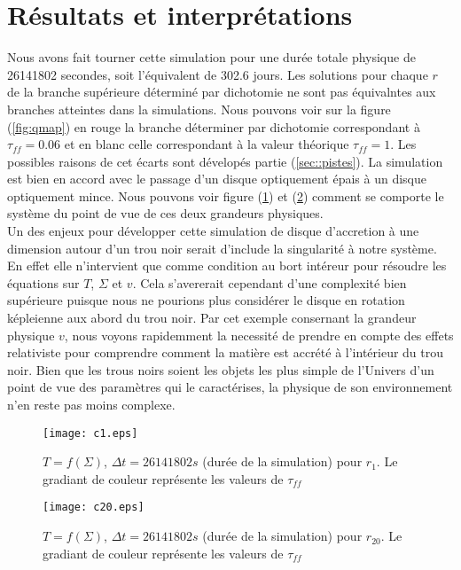 \section{Résultats et interprétations}

Nous avons fait tourner cette simulation pour une durée totale physique de 26141802 secondes, soit l'équivalent de 302.6 jours. 
Les solutions pour chaque $r$ de la branche supérieure déterminé par dichotomie ne sont pas équivalntes aux branches atteintes dans la simulations. Nous pouvons voir sur la figure (\ref{fig:qmap}) en rouge la branche déterminer par dichotomie correspondant à $\tau_{ff} = 0.06 $ et en blanc celle correspondant à la valeur théorique $\tau_{ff} = 1$. Les possibles raisons de cet écarts sont dévelopés partie (\ref{sec::pistes}). La simulation est bien en accord avec le passage d'un disque optiquement épais à un disque optiquement mince. Nous pouvons voir figure (\ref{fig:c1.eps}) et (\ref{fig:c20.eps}) comment se comporte le système du point de vue de ces deux grandeurs physiques.  \\


Un des enjeux pour développer cette simulation de disque d'accretion à une dimension autour d'un trou noir serait d'include la singularité à notre système. En effet elle n'intervient que comme condition au bort intéreur pour résoudre les équations sur $T$, $\Sigma$ et $v$. Cela s'avererait cependant d'une complexité bien supérieure puisque nous ne pourions plus considérer le disque en rotation képleienne aux abord du trou noir. Par cet exemple consernant la grandeur physique $v$, nous voyons rapidemment la necessité de prendre en compte des effets relativiste pour comprendre comment la matière est accrété à l'intérieur du trou noir. Bien que les trous noirs soient les objets les plus simple de l'Univers d'un point de vue des paramètres qui le caractérises, la physique de son environnement n'en reste pas moins complexe. 
 

\begin{figure}
  \begin{center}
    \texttt{[image: c1.eps]}
  \end{center}
  \caption{$T=f(\Sigma)$, $\Delta t = 26141802 s$ (durée de la simulation) pour $r_{1}$. Le gradiant de couleur représente les valeurs de $\tau_{ff}$}
  \label{fig:c1.eps}
\end{figure} 

\begin{figure}
  \begin{center}
    \texttt{[image: c20.eps]}
  \end{center}
  \caption{$T=f(\Sigma)$, $\Delta t = 26141802 s$ (durée de la simulation) pour $r_{20}$. Le gradiant de couleur représente les valeurs de $\tau_{ff}$}
  \label{fig:c20.eps}
\end{figure}


